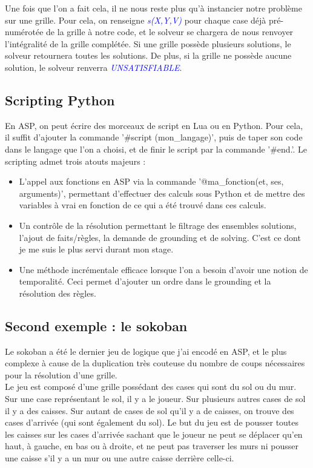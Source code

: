 \documentclass[10pt,a4paper]{article}
\begin{document}
Une fois que l'on a fait cela, il ne nous reste plus qu'à instancier notre problème sur une grille. Pour cela, on renseigne \emph{\textcolor{blue}{s(X,Y,V)}} pour chaque case déjà pré-numérotée de la grille à notre code, et le 
solveur se chargera de nous renvoyer l'intégralité de la grille complétée. Si une grille possède plusieurs solutions, le solveur retournera toutes les solutions. De plus, si la grille ne possède aucune solution, le solveur renverra 
\emph{\textcolor{blue}{UNSATISFIABLE}}.

\subsection{Scripting Python}
En ASP, on peut écrire des morceaux de script en Lua ou en Python. Pour cela, il suffit d'ajouter la commande '\#script (mon\_langage)', puis de taper son code dans le langage que l'on a choisi, et de finir le script par la 
commande '\#end.'. Le scripting admet trois atouts majeurs :
\begin{itemize}
	\item L'appel aux fonctions en ASP via la commande '@ma\_fonction(et, ses, arguments)', permettant d'effectuer des calculs sous Python et de mettre des variables à vrai en fonction de ce qui a été trouvé dans ces 
	calculs.
	\item Un contrôle de la résolution permettant le filtrage des ensembles solutions, l'ajout de faits/règles, la demande de grounding et de solving. C'est ce dont je me suis le plus servi durant mon stage.
	\item Une méthode incrémentale efficace lorsque l'on a besoin d'avoir une notion de temporalité. Ceci permet d'ajouter un ordre dans le grounding et la résolution des règles.
\end{itemize}

\subsection{Second exemple : le sokoban}
Le sokoban a été le dernier jeu de logique que j'ai encodé en ASP, et le plus complexe à cause de la duplication très couteuse du nombre de coups nécessaires pour la résolution d'une grille.\\

Le jeu est composé d'une grille possédant des cases qui sont du sol ou du mur. Sur une case représentant le sol, il y a le joueur. Sur plusieurs autres cases de sol il y a des caisses. Sur autant de cases de sol qu'il y a de 
caisses, on trouve des cases d'arrivée (qui sont également du sol). Le but du jeu est de pousser toutes les caisses sur les cases d'arrivée sachant que le joueur ne peut se déplacer qu'en haut, à gauche, en bas ou à droite, et ne 
peut pas traverser les murs ni pousser une caisse s'il y a un mur ou une autre caisse derrière celle-ci.\\ \\
\end{document}
